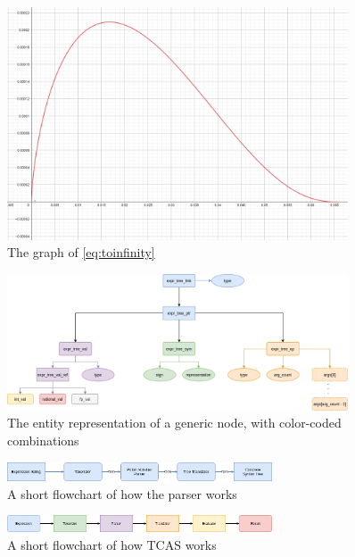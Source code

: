\documentclass{article}
\theoremstyle{plain}
\theoremstyle{definition}
\theoremstyle{algorithm}
\begin{document}
	\newpage
	\appendix
	\begin{figure}
		\centering
		\includegraphics[width=0.9\textwidth]{img/limoff1.PNG}
		\caption{The graph of \eqref{eq:toinfinity}}\label{fig:limoff1}
	\end{figure}

	\begin{figure}
		\centering
		\includegraphics[width=0.9\textwidth]{chart/expr_structs.PNG}
		\caption{The entity representation of a generic node, with color-coded combinations} \label{fig:expr_structs}
	\end{figure}

	\begin{figure}
		\centering
		\includegraphics[width=0.7\textwidth]{chart/parser.PNG}
		\caption{A short flowchart of how the parser works} \label{fig:parser}
	\end{figure}

	\begin{figure}
		\centering
		\includegraphics[width=0.7\textwidth]{chart/general_flowchart.PNG}
		\caption{A short flowchart of how TCAS works} \label{fig:tcas} 
	\end{figure}
\end{document}
